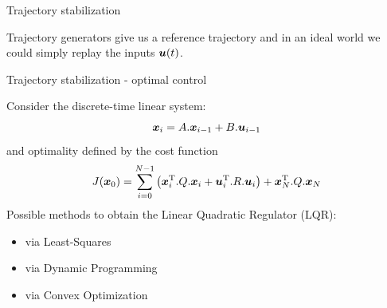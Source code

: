 \documentclass[usenames,dvipsnames,xcolor=table]{beamer}
\begin{document}
\begin{frame}{Trajectory stabilization}
\begin{center}
Trajectory generators give us a reference trajectory and in an ideal world we could simply replay the inputs $ \boldsymbol{u} (t)$.\\
\end{center}
\end{frame}
\begin{frame}{Trajectory stabilization - optimal control}
\begin{center}
Consider the discrete-time linear system:
\begin{equation*}
 \boldsymbol{x} _i = A. \boldsymbol{x} _{i-1} + B. \boldsymbol{u} _{i-1}
\end{equation*}
and optimality defined by the cost function
\begin{equation}
J( \boldsymbol{x} _0) = \sum_{{i=0}}^{{N-1}}\left( {\boldsymbol{x} }^{\text{T}}_i.Q. \boldsymbol{x} _i + { \boldsymbol{u} }^{\text{T}}_i.R. \boldsymbol{u} _i\right) +  {\boldsymbol{x} }^{\text{T}}_N.Q. \boldsymbol{x} _N
\end{equation}
Possible methods to obtain the Linear Quadratic Regulator (LQR):\\[6pt]
\begin{minipage}[c]{0.5\linewidth}
\begin{itemize}
\item via Least-Squares
\item via Dynamic Programming
\item via Convex Optimization
\end{itemize}
\end{minipage}
\end{center}
\end{frame}
\end{document}
